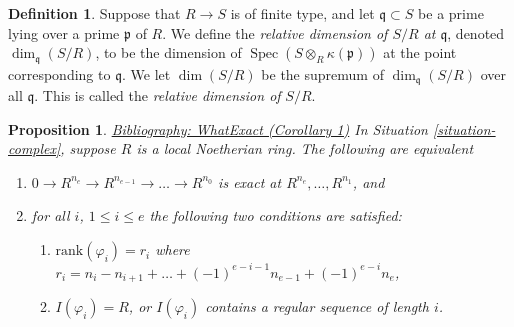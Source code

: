 \documentclass{amsart}
\newenvironment{reference}{\comment}{\endcomment}
\theoremstyle{plain}
\newtheorem{proposition}[subsection]{Proposition}
\theoremstyle{definition}
\newtheorem{definition}[subsection]{Definition}
\theoremstyle{remark}
\numberwithin{equation}{subsection}
\def\Spec{\mathop{\mathrm{Spec}}}
\begin{document}
\begin{definition}
\label{definition-relative-dimension}
Suppose that $R \to S$ is of finite type, and let
$\mathfrak q \subset S$ be a prime lying over a prime
$\mathfrak p$ of $R$.
We define the {\it relative dimension
of $S/R$ at $\mathfrak q$}, denoted
$\dim_{\mathfrak q}(S/R)$, to be the dimension
of $\Spec(S \otimes_R \kappa(\mathfrak p))$
at the point corresponding to $\mathfrak q$. We let
$\dim(S/R)$ be the supremum of $\dim_{\mathfrak q}(S/R)$
over all $\mathfrak q$. This is called the
{\it relative dimension of} $S/R$.
\end{definition}

\begin{proposition}
\label{proposition-what-exact}
\begin{reference}
\href{https://stacks.math.columbia.edu/bibliography}{Bibliography: WhatExact (Corollary 1)}
\end{reference}
In Situation \ref{situation-complex}, suppose $R$ is
a local Noetherian ring. The following are equivalent
\begin{enumerate}
\item $0 \to R^{n_e} \to R^{n_{e-1}} \to \ldots \to R^{n_0}$
is exact at $R^{n_e}, \ldots, R^{n_1}$, and
\item for all $i$, $1 \leq i \leq e$
the following two conditions are satisfied:
\begin{enumerate}
\item $\text{rank}(\varphi_i) = r_i$ where
$r_i = n_i - n_{i + 1} + \ldots + (-1)^{e-i-1} n_{e-1} + (-1)^{e-i} n_e$,
\item $I(\varphi_i) = R$, or $I(\varphi_i)$ contains a
regular sequence of length $i$.
\end{enumerate}
\end{enumerate}
\end{proposition}
\end{document}

